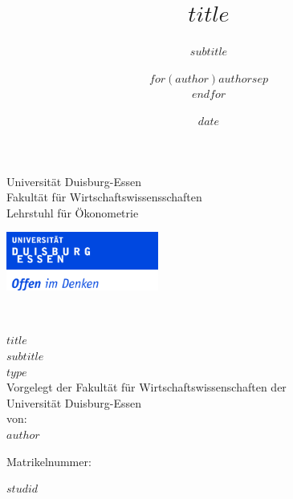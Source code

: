 \documentclass[$if(fontsize)$$fontsize$,$endif$$if(lang)$$lang$,$endif$$if(papersize)$$papersize$,$endif$$for(classoption)$$classoption$$sep$,$endfor$]{$documentclass$}
\title{$title$}
\title{}
\subtitle{$subtitle$}
\author{$for(author)$$author$$sep$ \\ $endfor$}
\author{}
\date{$date$}
\date{}
\begin{document}

\begin{titlepage}
  \noindent\begin{minipage}{0.6\textwidth}
	  Universität Duisburg-Essen\\
	  Fakultät für Wirtschaftswissensschaften\\
	  Lehrstuhl für Ökonometrie\\
  \end{minipage}
	\begin{minipage}{0.4\textwidth}
	  \begin{flushright}
  	  \vspace{-0.5cm}
  	  \includegraphics*[width=5cm]{Includes/duelogo.jpg} %
	  \end{flushright}
	\end{minipage}
  \\
  \vspace{1.5cm}
  \begin{center}
  \huge{$title$}\\
  \vspace{.25cm}
  \Large{$subtitle$}\\
  \vspace{0.5cm}
  \large{$type$}\\
  \vspace{1cm}
  \large{Vorgelegt der Fakultät für Wirtschaftswissenschaften der \\ Universität Duisburg-Essen}\\
  \vspace{0.75cm}
  \large{von:}\\
  \vspace{0.5cm}
  $author$\\
  \end{center}
  \vspace{4cm}
  
  \noindent\begin{minipage}[t]{0.3\textwidth}
  Matrikelnummer:
  \end{minipage}
  \begin{minipage}[t]{0.7\textwidth}
  \hspace{1cm}$studid$
  \end{minipage}  
  

\end{titlepage}
\end{document}
